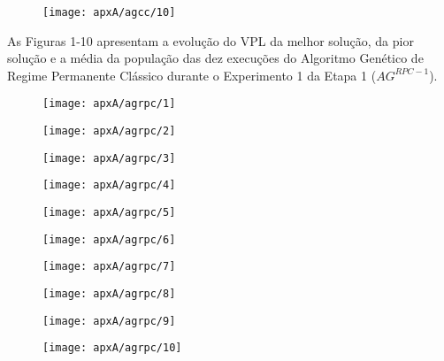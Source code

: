 \begin{figure}[H]
\centering

\texttt{[image: apxA/agcc/10]}
\end{figure}

As Figuras 1-10 apresentam a evolução do VPL da melhor solução, da pior solução e a média da população das dez execuções do Algoritmo Genético de Regime Permanente Clássico durante o Experimento 1 da Etapa 1 ($AG^{RPC-1}$).

\begin{figure}[H]
\centering

\texttt{[image: apxA/agrpc/1]}
\end{figure}

\begin{figure}[H]
\centering

\texttt{[image: apxA/agrpc/2]}
\end{figure}

\begin{figure}[H]
\centering

\texttt{[image: apxA/agrpc/3]}
\end{figure}

\begin{figure}[H]
\centering

\texttt{[image: apxA/agrpc/4]}
\end{figure}

\begin{figure}[H]
\centering

\texttt{[image: apxA/agrpc/5]}
\end{figure}

\begin{figure}[H]
\centering

\texttt{[image: apxA/agrpc/6]}
\end{figure}

\begin{figure}[H]
\centering

\texttt{[image: apxA/agrpc/7]}
\end{figure}

\begin{figure}[H]
\centering

\texttt{[image: apxA/agrpc/8]}
\end{figure}

\begin{figure}[H]
\centering

\texttt{[image: apxA/agrpc/9]}
\end{figure}

\begin{figure}[H]
\centering

\texttt{[image: apxA/agrpc/10]}
\end{figure}


